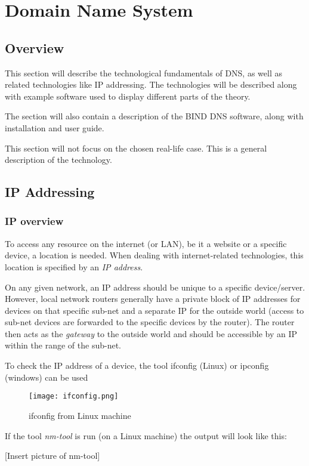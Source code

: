 \chapter{Domain Name System}
\section{Overview}
This section will describe the technological fundamentals of DNS, as well as related technologies like IP addressing. The technologies will be described along with example software used to display different parts of the theory.

The section will also contain a description of the BIND DNS software, along with installation and user guide. 

This section will not focus on the chosen real-life case. This is a general description of the technology.
\section{IP Addressing}
\subsection{IP overview}
To access any resource on the internet (or LAN), be it a website or a specific device, a location is needed. When dealing with internet-related technologies, this location is specified by an \textit{IP address}. 

On any given network, an IP address should be unique to a specific device/server. However, local network routers generally have a private block of IP addresses for devices on that specific sub-net and a separate IP for the outside world (access to sub-net devices are forwarded to the specific devices by the router).
The router then acts as the \textit{gateway} to the outside world and should be accessible by an IP within the range of the sub-net.

To check the IP address of a device, the tool ifconfig (Linux) or ipconfig (windows) can be used

\begin{figure}[h!]
	\centering
	\texttt{[image: ifconfig.png]}
	\caption{ifconfig from Linux machine}
\end{figure}


If the tool \textit{nm-tool} is run (on a Linux machine) the output will look like this:

[Insert picture of nm-tool]

